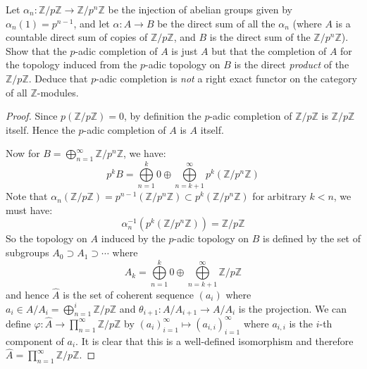 \documentclass{solution}
\begin{document}
\begin{problem}
    Let $\alpha_n: \mathbb{Z} / p \mathbb{Z} \rightarrow \mathbb{Z} / p^n \mathbb{Z}$ be the injection of abelian groups given by $\alpha_n(1) = p^{n - 1}$, and let $\alpha: A \rightarrow B$ be the direct sum of all the $\alpha_n$ (where $A$ is a countable direct sum of copies of $\mathbb{Z} / p \mathbb{Z}$, and $B$ is the direct sum of the $\mathbb{Z} / p^n \mathbb{Z}$). Show that the $p$-adic completion of $A$ is just $A$ but that the completion of $A$ for the topology induced from the $p$-adic topology on $B$ is the direct \textit{product} of the $\mathbb{Z} / p \mathbb{Z}$. Deduce that $p$-adic completion is \textit{not} a right exact functor on the category of all $\mathbb{Z}$-modules.
\end{problem}

\begin{proof}
    Since $p (\mathbb{Z} / p \mathbb{Z}) = 0$, by definition the $p$-adic completion of $\mathbb{Z} / p \mathbb{Z}$ is $\mathbb{Z} / p \mathbb{Z}$ itself. Hence the $p$-adic completion of $A$ is $A$ itself.

    Now for $B = \bigoplus_{n = 1}^{\infty} \mathbb{Z} / p^n \mathbb{Z}$, we have:
    $$p^kB = \bigoplus\limits_{n = 1}^{k} 0 \oplus \bigoplus\limits_{n = k + 1}^{\infty} p^k(\mathbb{Z} / p^n \mathbb{Z})$$
    Note that $\alpha_n(\mathbb{Z} / p \mathbb{Z}) = p^{n - 1}(\mathbb{Z} / p^n \mathbb{Z}) \subset p^k(\mathbb{Z} / p^n \mathbb{Z})$ for arbitrary $k \lt n$, we must have:
    $$\alpha_n ^{-1}(p^k(\mathbb{Z} / p^n \mathbb{Z})) = \mathbb{Z} / p \mathbb{Z}$$
    So the topology on $A$ induced by the $p$-adic topology on $B$ is defined by the set of subgroups $A_0 \supset A_1 \supset \cdots$ where
    $$A_k = \bigoplus\limits_{n = 1}^{k} 0 \oplus \bigoplus\limits_{n = k + 1}^{\infty} \mathbb{Z} / p \mathbb{Z}$$
    and hence $\hat{A}$ is the set of coherent sequence $(a_i)$ where $a_i \in A / A_i = \bigoplus\limits_{n = 1}^{i} \mathbb{Z} / p \mathbb{Z}$ and $\theta_{i + 1}: A / A_{i + 1} \rightarrow A / A_i$ is the projection. We can define $\varphi: \hat{A} \rightarrow \prod\limits_{n = 1}^{\infty} \mathbb{Z} / p \mathbb{Z}$ by $(a_i)_{i = 1}^{\infty} \mapsto (a_{i, i})_{i = 1}^{\infty}$ where $a_{i, i}$ is the $i$-th component of $a_i$. It is clear that this is a well-defined isomorphism and therefore $\hat{A} = \prod\limits_{n = 1}^{\infty} \mathbb{Z} / p \mathbb{Z}$.


\end{proof}
\end{document}
